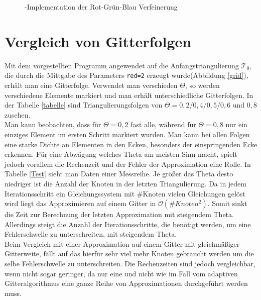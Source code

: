 \begin{figure}[!htbp]
	
	\caption{\label{redref} \matlab-Implementation der Rot-Grün-Blau Verfeinerung}
\end{figure}
\newpage \newpage \newpage  
\section{Vergleich von Gitterfolgen}
Mit dem vorgestellten \matlab \:Programm angewendet auf die Anfangstriangulierung $\mathscr{T}_0$, die durch die Mittgabe des Parameters \texttt{red=2} erzeugt wurde(Abbildung \ref{grid}), erhält man eine Gitterfolge. Verwendet man verschieden $\Theta$, so werden verschiedene Elemente markiert und man erhält unterschiedliche Gitterfolgen. In der Tabelle \ref{tabelle} sind Triangulierungsfolgen von $\Theta =0,2/0,4/0,5/0,6 \text{ und } 0,8$ zusehen. \\
Man kann beobachten, dass für $\Theta = 0,2$ fast alle, während für $\Theta = 0,8$ nur ein einziges Element im ersten Schritt markiert wurden. Man kann bei allen Folgen eine starke Dichte an Elementen in den Ecken, besonders der einspringenden Ecke erkennen. Für eine Abwägung welches Theta am meisten Sinn macht, spielt jedoch vorallem die Rechenzeit und der Fehler der Approximation eine Rolle. In Tabelle \ref{Test} sieht man Daten einer Messreihe. Je größer das Theta desto niedriger ist die Anzahl der Knoten in der letzten Triangulierung. Da in jedem Iterationsschritt ein Gleichungssystem mit \#Knoten vielen Gleichungen gelöst wird liegt das Approximieren auf einem Gitter in $\mathscr{O}(\#Knoten^2)$. Somit sinkt die Zeit zur Berechnung der letzten Approximation mit steigendem Theta. Allerdings steigt die Anzahl der Iterationsschritte, die benötigt werden, um eine Fehlerschwelle zu unterschreiten, mit steigendem Theta.\\
Beim Vergleich mit einer Approximation auf einem Gitter mit gleichmäßiger Gitterweite, fällt auf das hierfür sehr viel mehr Knoten gebraucht werden um die selbe Fehlerschwelle zu unterschreiten. Die Rechenzeiten sind jedoch vergleichbar, wenn nicht sogar geringer, da nur eine und nicht wie im Fall vom adaptiven Gitteralgorithmus eine ganze Reihe von Approximationen durchgeführt werden muss.\\
